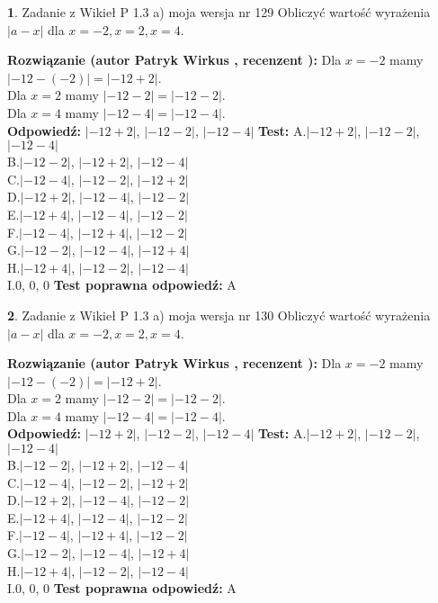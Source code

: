 \documentclass[12pt, a4paper]{article}
\theoremstyle{definition} %
\newtheorem{zad}{}
\newcommand{\zadStart}[1]{\begin{zad}#1\newline}
\newcommand{\zadStop}{\end{zad}}
\newcommand{\rozwStart}[2]{\noindent \textbf{Rozwiązanie (autor #1 , recenzent #2): }\newline}
\newcommand{\rozwStop}{\newline}
\newcommand{\odpStart}{\noindent \textbf{Odpowiedź:}\newline}
\newcommand{\odpStop}{\newline}
\newcommand{\testStart}{\noindent \textbf{Test:}\newline}
\newcommand{\testStop}{\newline}
\newcommand{\kluczStart}{\noindent \textbf{Test poprawna odpowiedź:}\newline}
\newcommand{\kluczStop}{\newline}
\begin{document}
\zadStart{Zadanie z Wikieł P 1.3 a) moja wersja nr 129}
Obliczyć wartość wyrażenia $|a - x|$ dla $x=-2,x=2,x=4$.
\zadStop
\rozwStart{Patryk Wirkus}{}
Dla $x = -2$ mamy $|-12 - (-2)| = |-12 + 2|$.\\
Dla $x = 2$ mamy $|-12 - 2| = |-12 - 2|$.\\
Dla $x = 4$ mamy $|-12 - 4| = |-12 - 4|$.\\
\rozwStop
\odpStart
$|-12 + 2|$, $|-12 - 2|$, $|-12 - 4|$
\odpStop
\testStart
A.$|-12 + 2|$, $|-12 - 2|$, $|-12 - 4|$\\
B.$|-12 - 2|$, $|-12 + 2|$, $|-12 - 4|$\\
C.$|-12 - 4|$, $|-12 - 2|$, $|-12 + 2|$\\
D.$|-12 + 2|$, $|-12 - 4|$, $|-12 - 2|$\\
E.$|-12 + 4|$, $|-12 - 4|$, $|-12 - 2|$\\
F.$|-12 - 4|$, $|-12 + 4|$, $|-12 - 2|$\\
G.$|-12 - 2|$, $|-12 - 4|$, $|-12 + 4|$\\
H.$|-12 + 4|$, $|-12 - 2|$, $|-12 - 4|$\\
I.$0$, $0$, $0$
\testStop
\kluczStart
A
\kluczStop



\zadStart{Zadanie z Wikieł P 1.3 a) moja wersja nr 130}
Obliczyć wartość wyrażenia $|a - x|$ dla $x=-2,x=2,x=4$.
\zadStop
\rozwStart{Patryk Wirkus}{}
Dla $x = -2$ mamy $|-12 - (-2)| = |-12 + 2|$.\\
Dla $x = 2$ mamy $|-12 - 2| = |-12 - 2|$.\\
Dla $x = 4$ mamy $|-12 - 4| = |-12 - 4|$.\\
\rozwStop
\odpStart
$|-12 + 2|$, $|-12 - 2|$, $|-12 - 4|$
\odpStop
\testStart
A.$|-12 + 2|$, $|-12 - 2|$, $|-12 - 4|$\\
B.$|-12 - 2|$, $|-12 + 2|$, $|-12 - 4|$\\
C.$|-12 - 4|$, $|-12 - 2|$, $|-12 + 2|$\\
D.$|-12 + 2|$, $|-12 - 4|$, $|-12 - 2|$\\
E.$|-12 + 4|$, $|-12 - 4|$, $|-12 - 2|$\\
F.$|-12 - 4|$, $|-12 + 4|$, $|-12 - 2|$\\
G.$|-12 - 2|$, $|-12 - 4|$, $|-12 + 4|$\\
H.$|-12 + 4|$, $|-12 - 2|$, $|-12 - 4|$\\
I.$0$, $0$, $0$
\testStop
\kluczStart
A
\kluczStop
\end{document}
